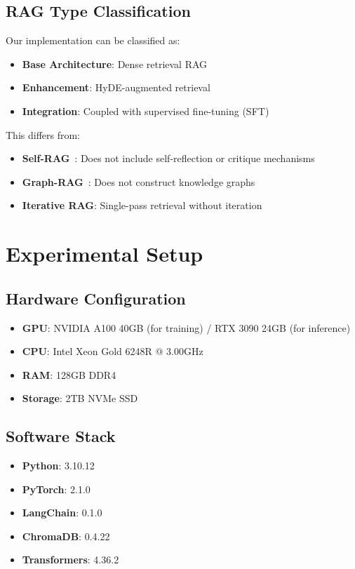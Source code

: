 \documentclass[11pt,a4paper]{article}
\begin{document}
\subsection{RAG Type Classification}

Our implementation can be classified as:
\begin{itemize}
    \item \textbf{Base Architecture}: Dense retrieval RAG
    \item \textbf{Enhancement}: HyDE-augmented retrieval
    \item \textbf{Integration}: Coupled with supervised fine-tuning (SFT)
\end{itemize}

This differs from:
\begin{itemize}
    \item \textbf{Self-RAG}~\cite{asai2023selfrag}: Does not include self-reflection or critique mechanisms
    \item \textbf{Graph-RAG}~\cite{edge2024local}: Does not construct knowledge graphs
    \item \textbf{Iterative RAG}: Single-pass retrieval without iteration
\end{itemize}

\section{Experimental Setup}

\subsection{Hardware Configuration}

\begin{itemize}
    \item \textbf{GPU}: NVIDIA A100 40GB (for training) / RTX 3090 24GB (for inference)
    \item \textbf{CPU}: Intel Xeon Gold 6248R @ 3.00GHz
    \item \textbf{RAM}: 128GB DDR4
    \item \textbf{Storage}: 2TB NVMe SSD
\end{itemize}

\subsection{Software Stack}

\begin{itemize}
    \item \textbf{Python}: 3.10.12
    \item \textbf{PyTorch}: 2.1.0
    \item \textbf{LangChain}: 0.1.0
    \item \textbf{ChromaDB}: 0.4.22
    \item \textbf{Transformers}: 4.36.2
\end{itemize}
\end{document}
